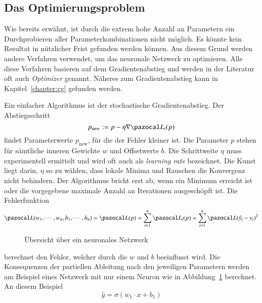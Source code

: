 \subsection{Das Optimierungsproblem}
Wie bereits erwähnt, ist durch die extrem hohe Anzahl an Parametern ein Durchprobieren aller Parameterkombinationen nicht möglich.
Es könnte kein Resultat in nützlicher Frist gefunden werden können.
Aus diesem Grund werden andere Verfahren verwendet, um das neuronale
Netzwerk zu optimieren.
Alle diese Verfahren basieren auf dem Gradientenabstieg und werden
in der Literatur oft auch {\em Optimizer} genannt.
%
%
Näheres zum Gradientenabstieg kann in Kapitel~\ref{chapter:cg} gefunden werden.

Ein einfacher Algorithmus ist der stochastische Gradientenabstieg.
%
Der Abstiegsschritt 
\begin{equation}
p_{\text{new}}:=p-\eta \nabla \Lb_{i}(p)
\end{equation}
findet Parameterwerte $p_{\text{new}}$, für die der Fehler kleiner ist.
Die Parameter $p$ stehen für sämtliche inneren Gewichte $w$ und Offsetwerte $b$.
Die Schrittweite $\eta$ muss experimentell ermittelt und wird oft
auch als {\em learning rate} bezeichnet.
%
Die Kunst liegt darin, $\eta$ so zu wählen, dass lokale Minima und Rauschen die Konvergenz nicht behindern.
Der Algorithmus bricht erst ab, wenn ein Minimum erreicht ist oder die vorgegebene maximale Anzahl an Iterationen ausgeschöpft ist.
Die Fehlerfunktion
\begin{equation}
\Lb(w_1, \cdots, w_n, b_1, \cdots, b_n)
=
\Lb(p)
=
\sum_{i=1}^{n}\Lb_{i}(p)
=
\sum_{i=1}^{n}\Lb(\hat{y_i}-y_i)^2
\end{equation}
\begin{figure}
	\begin{center}
		
		\caption{Übersicht über ein neuronales Netzwerk}
		\label{ableitung:fig:single_neuron}
	\end{center}
\end{figure}%
berechnet den Fehler, welcher durch die $w$ und $b$ beeinflusst wird.
Die Konsequenzen der partiellen Ableitung nach den jeweiligen
Parametern werden am Beispiel eines Netzwerk mit nur einem Neuron
wie in Abbildung~\ref{ableitung:fig:single_neuron} berechnet.
An diesem Beispiel
\begin{equation}
\hat{y} = \sigma \left( w_1 \cdot x + b_1 \right)
\end{equation}
